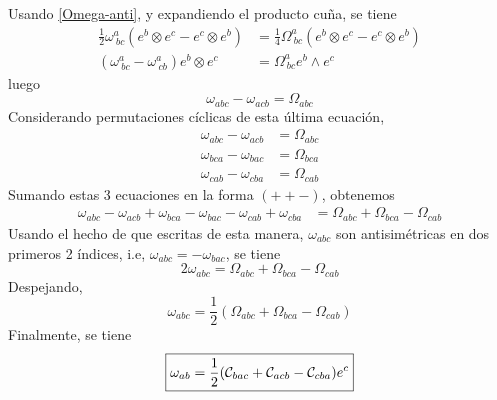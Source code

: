 Usando \eqref{Omega-anti}, y expandiendo el producto cuña, se tiene
\begin{align}
  \frac{1}{2}\omega^{a}_{~bc}(e^b\otimes e^c-e^c\otimes e^b)&=\frac{1}{4}\Omega^{a}_{~bc}(e^b\otimes e^c-e^c\otimes e^b)\\
  (\omega^{a}_{~bc}-\omega^{a}_{~cb})e^b\otimes e^c&=\Omega^{a}_{~bc}e^b\wedge e^c
\end{align}
luego
\begin{equation}
  \omega_{abc}-\omega_{acb}=\Omega_{abc}
\end{equation}
Considerando permutaciones cíclicas de esta última ecuación,
\begin{align}
  \omega_{abc}-\omega_{acb}&=\Omega_{abc}\\
  \omega_{bca}-\omega_{bac}&=\Omega_{bca}\\
  \omega_{cab}-\omega_{cba}&=\Omega_{cab}
\end{align}
Sumando estas 3 ecuaciones en la forma $(++-)$, obtenemos
\begin{align}
   \omega_{abc}-\omega_{acb}+\omega_{bca}-\omega_{bac}-\omega_{cab}+\omega_{cba}&=\Omega_{abc}+\Omega_{bca}-\Omega_{cab}
\end{align}
Usando el hecho de que escritas de esta manera, $\omega_{abc}$ son antisimétricas en dos primeros 2 índices, i.e, $\omega_{abc}=-\omega_{bac}$, se tiene
\begin{equation}
  2\omega_{abc}=\Omega_{abc}+\Omega_{bca}-\Omega_{cab}
\end{equation}
Despejando,
\begin{equation}
  \omega_{abc}=\frac{1}{2}(\Omega_{abc}+\Omega_{bca}-\Omega_{cab})
\end{equation}
Finalmente, se tiene
\begin{equation}\label{izau2}
  \boxed{\omega_{ab}=\frac{1}{2}(\mathcal{C}_{bac}+\mathcal{C}_{acb}-\mathcal{C}_{cba})e^c}
\end{equation}

